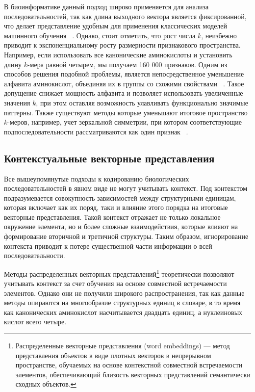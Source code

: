 \documentclass[specification,annotation,times]{itmo-student-thesis}
\begin{document}
В биоинформатике данный подход широко применяется для анализа последовательностей, так как длина выходного вектора является фиксированной, что делает представление удобным для применения классических моделей машинного обучения ~\cite{ofer2015profet, naamati2009clantox, leslie2001spectrum}. Однако, стоит отметить, что рост числа $k$, неизбежно приводит к экспоненциальному росту размерности признакового пространства. Например, если использовать все канонические аминокислоты и установить длину $k$-мера равной четырем, мы получаем 160 000 признаков. Одним из способов решения подобной проблемы, является непосредственное уменьшение алфавита аминокислот, объединяя их в группы со схожими свойствами ~\cite{weathers2004reduced}. Такое допущение снижает мощность алфавита и позволяет использовать увеличенные значения $k$, при этом оставляя возможность улавливать функционально значимые паттерны. Также существуют методы которые уменьшают итоговое пространство  $k$-меров, например, учет зеркальной симметрии, при котором соответствующие подпоследовательности рассматриваются как один признак ~\cite{ofer2015profet}.

\subsection{Контекстуальные векторные представления}

Все вышеупомянутые подходы к кодированию биологических последовательностей в явном виде не могут учитывать контекст. Под контекстом подразумевается совокупность зависимостей между структурными единицам, которая включает как их поряд, таки и влияние этого порядка на итоговые векторные представления. Такой контекст отражает не только локальное окружение элемента, но и более сложные взаимодействия, которые влияют на формирование вторичной и третичной структуры. Таким образом, игнорирование контекста приводит к потере существенной части информации о всей последовательности.

Методы распределенных векторных представлений\footnote{Распределенные векторные представления (word embeddings) --- метод представления объектов в виде плотных векторов в непрерывном пространстве, обучаемых на основе контекстной совместной встречаемости элементов, обеспечивающий близость векторных представлений семантически сходных объектов.} теоретически позволяют учитывать контекст за счет обучения на основе совместной встречаемости элементов.  Однако они не получили широкого распространения, так как данные методы опираются на многообразие структурных единиц в словаре, в то время как канонических аминокислот насчитывается двадцать единиц, а нуклеиновых кислот всего четыре.
\end{document}
